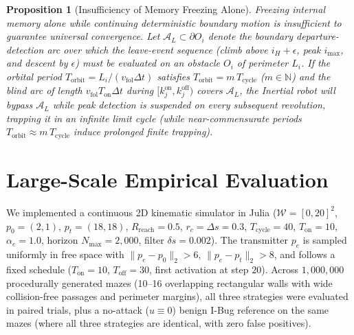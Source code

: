 \documentclass[10pt, a4paper, twocolumn]{article}
\newtheorem{proposition}{Proposition}
\begin{document}
\begin{proposition}[Insufficiency of Memory Freezing Alone]
\label{prop:resonance}
Freezing internal memory alone while continuing deterministic boundary motion is insufficient to guarantee universal convergence. Let $\mathcal{A}_L \subset \partial O_i$ denote the boundary departure-detection arc over which the leave-event sequence (climb above $i_H + \epsilon$, peak $i_{\max}$, and descent by $\epsilon$) must be evaluated on an obstacle $O_i$ of perimeter $L_i$. If the orbital period $T_{\text{orbit}} = L_i / (v_{\text{fol}}\Delta t)$ satisfies $T_{\text{orbit}} = m\,T_{\text{cycle}}$ ($m \in \mathbb{N}$) and the blind arc of length $v_{\text{fol}} T_{\text{on}}\Delta t$ during $[k_j^{\text{on}}, k_j^{\text{off}})$ covers $\mathcal{A}_L$, the Inertial robot will bypass $\mathcal{A}_L$ while peak detection is suspended on every subsequent revolution, trapping it in an infinite limit cycle (while near-commensurate periods $T_{\text{orbit}} \approx m\,T_{\text{cycle}}$ induce prolonged finite trapping).
\end{proposition}

\section{Large-Scale Empirical Evaluation}
We implemented a continuous 2D kinematic simulator in Julia ($\mathcal{W} = [0, 20]^2$, $p_0 = (2, 1)$, $p_t = (18, 18)$, $R_{\text{reach}} = 0.5$, $r_c = \Delta s = 0.3$, $T_{\text{cycle}} = 40$, $T_{\text{on}} = 10$, $\alpha_e = 1.0$, horizon $N_{\max} = 2,000$, filter $\delta s = 0.002$). The transmitter $p_e$ is sampled uniformly in free space with $\|p_e - p_0\|_2 > 6$, $\|p_e - p_t\|_2 > 8$, and follows a fixed schedule ($T_{\text{on}} = 10$, $T_{\text{off}} = 30$, first activation at step $20$). Across $1,000,000$ procedurally generated mazes (10--16 overlapping rectangular walls with wide collision-free passages and perimeter margins), all three strategies were evaluated in paired trials, plus a no-attack ($u \equiv 0$) benign I-Bug reference on the same mazes (where all three strategies are identical, with zero false positives).
\end{document}
